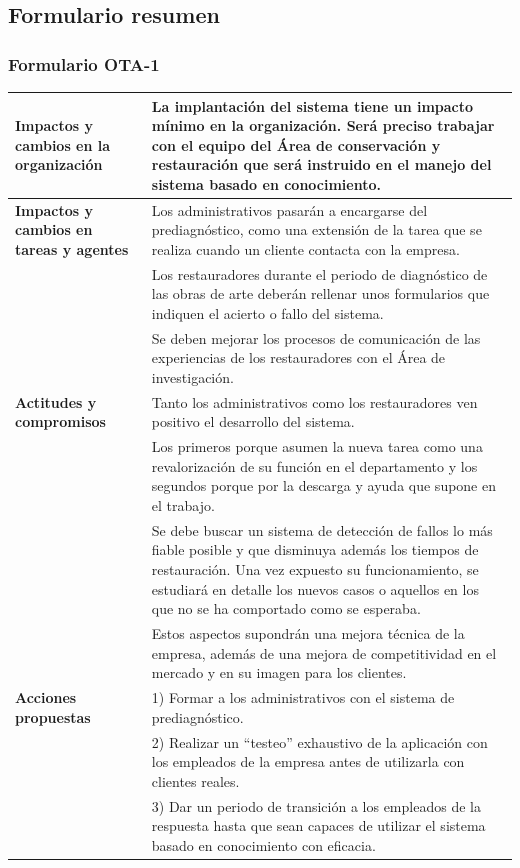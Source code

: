 \documentclass[a4paper,11pt]{article}
\begin{document}
		\subsection{Formulario resumen}
			\subsubsection{Formulario OTA-1}
			\begin{center}
				\begin{tabular}{| p{3cm} | p{8.5cm} |}
					\hline
					\textbf{Impactos y cambios en la organización} & La implantación del
					sistema tiene un impacto mínimo en la organización. Será preciso trabajar
					con el equipo del Área de conservación y restauración que será instruido en
					el manejo del sistema basado en conocimiento.\\
					\hline
					\textbf{Impactos y cambios en tareas y agentes} & Los administrativos
					pasarán a encargarse del prediagnóstico, como una extensión de la tarea que
					se realiza cuando un cliente contacta con la empresa.\\
					& Los restauradores durante el periodo de diagnóstico de las obras de arte
					deberán rellenar unos formularios que indiquen el acierto o fallo del
					sistema.\\
					& Se deben mejorar los procesos de comunicación de las experiencias de los
					restauradores con el Área de investigación.\\
					\hline
					\textbf{Actitudes y compromisos} & Tanto los administrativos como los
					restauradores ven positivo el desarrollo del sistema.\\
					& Los primeros porque asumen la nueva tarea como una revalorización de su
					función en el departamento y los segundos porque por la descarga y ayuda que supone en el trabajo.\\
					& Se debe buscar un sistema de detección de fallos lo más fiable posible y
					que disminuya además los tiempos de restauración. Una vez expuesto su
					funcionamiento, se estudiará en detalle los nuevos casos o aquellos en los
					que no se ha comportado como se esperaba.\\
					& Estos aspectos supondrán una mejora técnica de la empresa, además de una
					mejora de competitividad en el mercado y en su imagen para los clientes.\\
					\hline
					\textbf{Acciones propuestas} & 1) Formar a los administrativos con el
					sistema de prediagnóstico.\\
					& 2) Realizar un “testeo” exhaustivo de la aplicación con los empleados de la
					empresa antes de utilizarla con clientes reales.\\
					& 3) Dar un periodo de transición a los empleados de la respuesta hasta que sean
					capaces de utilizar el sistema basado en conocimiento con eficacia.\\
					\hline
				\end{tabular}
			\end{center}
	\newpage
\end{document}
